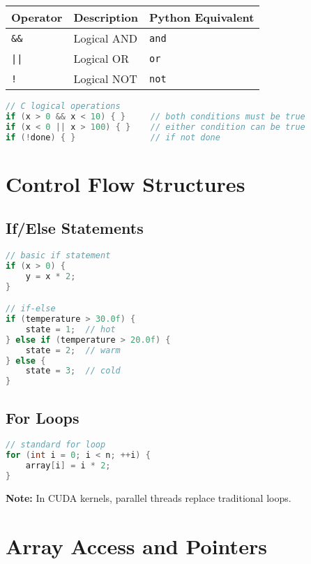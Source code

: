 \documentclass[11pt, a4paper]{article}
\newcommand{\code}[1]{\texttt{#1}}
\begin{document}
\begin{center}
\begin{tabular}{lll}
\toprule
Operator & Description & Python Equivalent \\
\midrule
\code{\&\&} & Logical AND & \code{and} \\
\code{||} & Logical OR & \code{or} \\
\code{!} & Logical NOT & \code{not} \\
\bottomrule
\end{tabular}
\end{center}

\begin{lstlisting}[language=C]
// C logical operations
if (x > 0 && x < 10) { }     // both conditions must be true
if (x < 0 || x > 100) { }    // either condition can be true
if (!done) { }               // if not done
\end{lstlisting}

\section*{Control Flow Structures}

\subsection*{If/Else Statements}

\begin{lstlisting}[language=C]
// basic if statement
if (x > 0) {
    y = x * 2;
}

// if-else
if (temperature > 30.0f) {
    state = 1;  // hot
} else if (temperature > 20.0f) {
    state = 2;  // warm
} else {
    state = 3;  // cold
}
\end{lstlisting}

\subsection*{For Loops}

\begin{lstlisting}[language=C]
// standard for loop
for (int i = 0; i < n; ++i) {
    array[i] = i * 2;
}
\end{lstlisting}

\textbf{Note:} In CUDA kernels, parallel threads replace traditional loops.

\section*{Array Access and Pointers}
\end{document}
